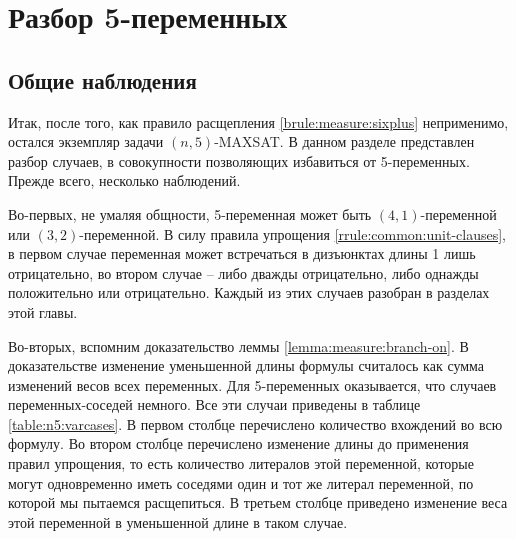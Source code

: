 
\section{Разбор 5-переменных}
\label{sec:n5}

\subsection{Общие наблюдения}
\label{subsec:n5:observations}

\firstpar{}Итак, после того, как правило расщепления \ref{brule:measure:sixplus} неприменимо, остался экземпляр задачи $(n,5)$-MAXSAT. В данном разделе представлен разбор случаев, в совокупности позволяющих избавиться от 5-переменных. Прежде всего, несколько наблюдений.

Во-первых, не умаляя общности, 5-переменная может быть $(4,1)$-переменной или $(3,2)$-переменной. В силу правила упрощения \ref{rrule:common:unit-clauses}, в первом случае переменная может встречаться в дизъюнктах длины 1 лишь отрицательно, во втором случае -- либо дважды отрицательно, либо однажды положительно или отрицательно. Каждый из этих случаев разобран в разделах этой главы.

Во-вторых, вспомним доказательство леммы \ref{lemma:measure:branch-on}. В доказательстве изменение уменьшенной длины формулы считалось как сумма изменений весов всех переменных. Для 5-переменных оказывается, что случаев переменных-соседей немного. Все эти случаи приведены в таблице \ref{table:n5:varcases}. В первом столбце перечислено количество вхождений во всю формулу. Во втором столбце перечислено изменение длины до применения правил упрощения, то есть количество литералов этой переменной, которые могут одновременно иметь соседями один и тот же литерал переменной, по которой мы пытаемся расщепиться. В третьем столбце приведено изменение веса этой переменной в уменьшенной длине в таком случае.

